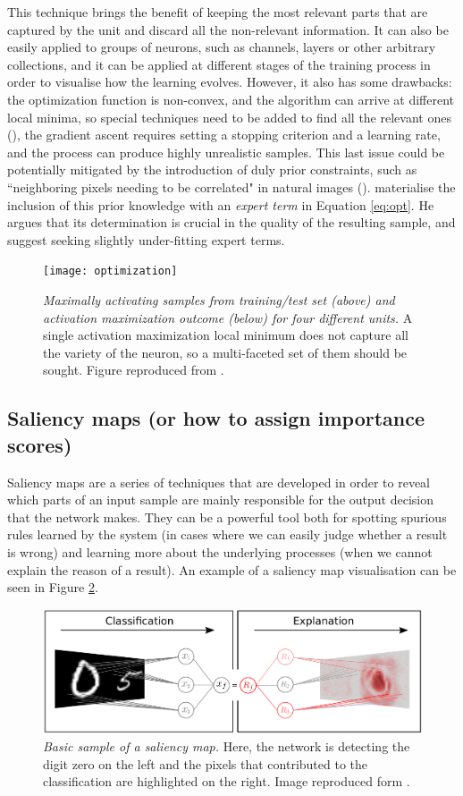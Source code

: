 This technique brings the benefit of keeping the most relevant parts that are captured by the unit and discard all the non-relevant information. It can also be easily applied to groups of neurons, such as channels, layers or other arbitrary collections, and it can be applied at different stages of the training process in order to visualise how the learning evolves. However, it also has some drawbacks: the optimization function is non-convex, and the algorithm can arrive at different local minima, so special techniques need to be added to find all the relevant ones (\cite{Nguyen2016,Olah2017}), the gradient ascent requires setting a stopping criterion and a learning rate, and the process can produce highly unrealistic samples. This last issue could be potentially mitigated by the introduction of duly prior constraints, such as ``neighboring pixels needing to be correlated" in natural images (\cite{Mordvintsev2015}). \cite{Montavon2018} materialise the inclusion of this prior knowledge with an \textit{expert term} in Equation \ref{eq:opt}. He argues that its determination is crucial in the quality of the resulting sample, and suggest seeking slightly under-fitting expert terms.    
\begin{figure}
	\centering
	\texttt{[image: optimization]}
	\caption{\textit{Maximally activating samples from training/test set (above) and activation maximization outcome (below) for four different units.} A single activation maximization local minimum does not capture all the variety of the neuron, so a multi-faceted set of them should be sought. Figure reproduced from \cite{Olah2017}.}
	\label{optimization}
\end{figure}


\subsection{Saliency maps (or how to assign importance scores)}

Saliency maps are a series of techniques that are developed in order to reveal which parts of an input sample are mainly responsible for the output decision that the network makes. They can be a powerful tool both for spotting spurious rules learned by the system (in cases where we can easily judge whether a result is wrong) and learning more about the underlying processes (when we cannot explain the reason of a result). An example of a saliency map visualisation can be seen in Figure \ref{fig:deeptaylor}.

\begin{figure}
	\centering
	\includegraphics[width=0.7\linewidth]{Figures/deeptaylor}
	\caption{\textit{Basic sample of a saliency map.} Here, the network is detecting the digit zero on the left and the pixels that contributed to the classification are highlighted on the right. Image reproduced form \cite{Montavon2017}.}
	\label{fig:deeptaylor}
\end{figure}


